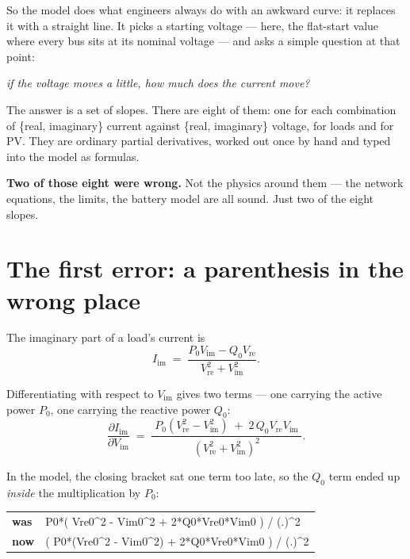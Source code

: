 \documentclass[11pt,a4paper]{article}
\newcommand{\code}[1]{{\ttfamily\small #1}}
\begin{document}
So the model does what engineers always do with an awkward curve: it replaces it with a
straight line. It picks a starting voltage --- here, the flat-start value where every
bus sits at its nominal voltage --- and asks a simple question at that point:

\begin{center}
\itshape if the voltage moves a little, how much does the current move?
\end{center}

The answer is a set of slopes. There are eight of them: one for each combination of
\{real, imaginary\} current against \{real, imaginary\} voltage, for loads and for PV.
They are ordinary partial derivatives, worked out once by hand and typed into the model
as formulas.

\textbf{Two of those eight were wrong.} Not the physics around them --- the network
equations, the limits, the battery model are all sound. Just two of the eight slopes.

\section{The first error: a parenthesis in the wrong place}

The imaginary part of a load's current is
\[
  I_{\mathrm{im}} \;=\; \frac{P_0 V_{\mathrm{im}} - Q_0 V_{\mathrm{re}}}
                              {V_{\mathrm{re}}^2 + V_{\mathrm{im}}^2}.
\]

Differentiating with respect to $V_{\mathrm{im}}$ gives two terms --- one carrying the
active power $P_0$, one carrying the reactive power $Q_0$:
\[
  \frac{\partial I_{\mathrm{im}}}{\partial V_{\mathrm{im}}}
  \;=\;
  \frac{\;P_0\!\left(V_{\mathrm{re}}^2 - V_{\mathrm{im}}^2\right)
        \;+\; 2\,Q_0 V_{\mathrm{re}} V_{\mathrm{im}}\;}
       {\left(V_{\mathrm{re}}^2 + V_{\mathrm{im}}^2\right)^2}.
\]

In the model, the closing bracket sat one term too late, so the $Q_0$ term ended up
\emph{inside} the multiplication by $P_0$:

\begin{center}
\begin{tabular}{@{}ll@{}}
\toprule
\textbf{was} & \code{P0*( Vre0\^{}2 - Vim0\^{}2 + 2*Q0*Vre0*Vim0 ) / (.)\^{}2} \\
\textbf{now} & \code{( P0*(Vre0\^{}2 - Vim0\^{}2) + 2*Q0*Vre0*Vim0 ) / (.)\^{}2} \\
\bottomrule
\end{tabular}
\end{center}
\end{document}
